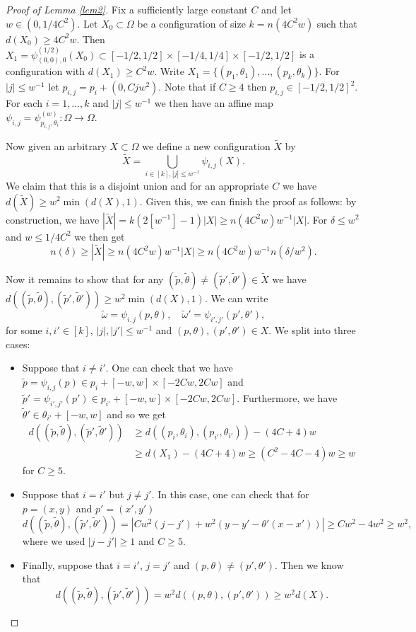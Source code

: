 \documentclass[11pt,letterpaper]{amsart}
\renewcommand{\le}{\leqslant}
\renewcommand{\ge}{\geqslant}
\def\d{\delta}
\begin{document}
\begin{proof}[Proof of Lemma \ref{lem2}]
    Fix a sufficiently large constant $C$ and let $w \in (0, 1/4C^2)$. Let $X_0 \subset \Omega$ be a configuration of size $k=n(4C^2w)$ such that $d(X_0)\ge 4C^2w$. Then $X_1 = \psi^{(1/2)}_{(0,0),0}(X_0) \subset [-1/2,1/2]\times[-1/4,1/4]\times [-1/2, 1/2]$ is a configuration with $d(X_1) \ge C^2 w$.
    Write $X_1 = \{ (p_1, \theta_1), \ldots, (p_k, \theta_k) \}$. 
    For $|j| \le w^{-1}$ let $p_{i, j} = p_i + (0, Cj w^2)$. Note that if $C\ge 4$ then $p_{i, j} \in [-1/2, 1/2]^2$. 
    For each $i=1, \ldots,k$ and $|j| \le w^{-1}$ we then have an affine map $\psi_{i,j} = \psi_{p_{i,j}, \theta_i}^{(w)}: \Omega\to \Omega$. 
    
    
    Now given an arbitrary $X \subset \Omega$ we define a new configuration $\tilde X$ by
    \[
    \tilde X = \bigcup_{i\in [k], |j| \le w^{-1}} \psi_{i,j}(X).
    \]
    We claim that this is a disjoint union and for an appropriate $C$ we have $d(\tilde X) \ge w^2 \min(d(X),1)$. Given this, we can finish the proof as follows: by construction, we have $|\tilde X| = k (2[w^{-1}]-1) |X| \ge n(4C^2 w) w^{-1}|X|$. For $\d \le w^2$ and $w \le 1/4C^2$ we then get
    \[
    n(\d) \ge |\tilde X| \ge n(4C^2 w) w^{-1}|X| \ge  n(4C^2 w) w^{-1} n(\d/w^2).
    \]
    
    Now it remains to show that for any $(\tilde p, \tilde \theta) \neq (\tilde p', \tilde \theta') \in \tilde X$ we have $d((\tilde p, \tilde \theta), (\tilde p', \tilde \theta')) \ge w^2 \min(d(X),1)$. We can write
    \[
    \tilde \omega = \psi_{i,j}(p, \theta),\quad \tilde \omega' = \psi_{i', j'}(p', \theta'),
    \]
    for some $i, i' \in [k]$, $|j|, |j'|\le w^{-1}$ and $(p,\theta), (p', \theta') \in X$. We split into three cases:
    \begin{itemize}
        \item Suppose that $i\neq i'$. One can check that we have $\tilde p=\psi_{i,j}(p) \in p_i + [-w, w]\times [-2Cw, 2C w]$ and $\tilde p'=\psi_{i', j'}(p') \in p_{i'}+ [-w, w]\times [-2Cw, 2C w]$. Furthermore, we have $\tilde \theta' \in \theta_{i'} + [-w,w]$ and so we get
        \begin{align*}
        d((\tilde p, \tilde \theta), (\tilde p', \tilde \theta')) &\ge d((p_i, \theta_i), (p_{i'}, \theta_{i'})) - (4C+4)w \\&\ge d(X_1) -(4C+4)w \ge (C^2-4C-4) w \ge w    
        \end{align*}
        for $C\ge 5$.

        \item Suppose that $i=i'$ but $j\neq j'$. In this case, one can check that for $p = (x, y)$ and $p'=(x', y')$
        \[
        d((\tilde p, \tilde \theta), (\tilde p', \tilde \theta')) = |Cw^2(j-j') +  w^2 (y - y' - \theta'(x-x'))| \ge Cw^2 - 4w^2 \ge w^2,
        \]
        where we used $|j-j'| \ge 1$ and $C\ge 5$. 
        \item Finally, suppose that $i=i'$, $j=j'$ and $(p, \theta) \neq (p', \theta')$. Then we know that 
        \[
        d((\tilde p, \tilde \theta), (\tilde p', \tilde \theta')) = w^2 d((p, \theta), (p', \theta')) \ge w^2 d(X).
        \]
    \end{itemize}


\end{proof}
\end{document}
